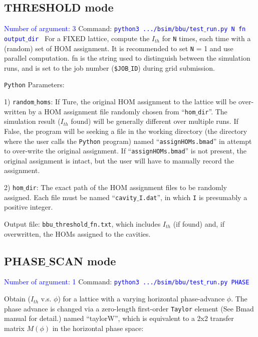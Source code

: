 \documentclass{article}
\begin{document}
\subsection{THRESHOLD mode}      
\textcolor{blue}{Number of argument: 3}
\bigbreak
Command: \textcolor{blue}{\texttt{python3 .../bsim/bbu/test$\_$run.py  \text{} N \text{} fn \text{} output$\_$dir }}
\bigbreak
For a FIXED lattice, compute the $I_{th}$ for \texttt{N} times, each time with a (random) set of HOM assignment. It is recommended to set \texttt{N} = 1 and use parallel computation. fn is the string used to distinguish between the simulation runs, and is set to the job number (\texttt{\$JOB$\_$ID}) during grid submission.

\bigbreak
\texttt{Python} Parameters:

1) \texttt{random$\_$homs}: If Ture, the original HOM assignment to the lattice will be over-written by a HOM assignment file  randomly chosen from ``\texttt{hom$\_$dir}''.
The simulation result ($I_{th}$ found) will be generally different over multiple runs. 
If False, the program will be seeking a file in the working directory (the directory where the user calls the \texttt{Python} program) named ``\texttt{assignHOMs.bmad}'' in attempt to over-write the original assignment. If ``\texttt{assignHOMs.bmad}'' is not present, the original assignment is intact, but the user will have to manually record the assignment. 

2) \texttt{hom$\_$dir}:
The exact path of the HOM assignment files to be randomly assigned. Each file must be named ``\texttt{cavity$\_$I.dat}'', in which \texttt{I} is presumably a positive integer.

\bigbreak
Output file:  \texttt{bbu$\_$threshold$\_$fn.txt}, which includes $I_{th}$ (if found) and, if overwritten, the HOMs assigned to the cavities.


\subsection{PHASE$\_$SCAN mode}
\textcolor{blue}{Number of argument: 1}
\bigbreak
Command:  \textcolor{blue}{\texttt{python3 .../bsim/bbu/test$\_$run.py  PHASE}}

Obtain ($I_{th}$ v.s. $\phi$) for a lattice with a varying horizontal phase-advance $\phi$. The phase advance is changed via a zero-length first-order \texttt{Taylor} element (See Bmad manual for detail.) named ``taylorW'', which is equivalent to a 2x2 transfer matrix $M(\phi)$ in the horizontal phase space:
\end{document}

